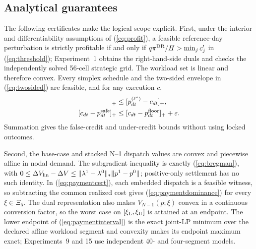 \documentclass[10pt,journal]{IEEEtran}
\begin{document}
\subsection{Analytical guarantees}

The following certificates make the logical scope explicit. First, under the
interior and differentiability assumptions of (\ref{eq:profit}), a feasible
reference-day perturbation is strictly profitable if and only if
$q\pi^{\rm DR}/H>\min_jc'_j$ in (\ref{eq:threshold}); Experiment~1 obtains the
right-hand-side duals and checks the independently solved 56-cell strategic
grid. The workload set is linear and therefore convex. Every simplex schedule
and the two-sided envelope in (\ref{eq:twosided}) are feasible, and for any
execution $c$,
\begin{align*}
[p^{\rm safe}_{dt}-c_{dt}]_+&\leq[p^{(\ell^\star)}_{dt}-c_{dt}]_+,\\
[c_{dt}-p^{\rm safe}_{dt}]_+&\leq[c_{dt}-p^{\rm floor}_{dt}]_++\varepsilon .
\end{align*}
Summation gives the false-credit and under-credit bounds without using locked
outcomes.

Second, the base-case and stacked N--1 dispatch values are convex and
piecewise affine in nodal demand. The subgradient inequality is exactly
(\ref{eq:bregman}), with
$0\leq\Delta V_{\rm lin}-\Delta V\leq
\lVert\lambda^1-\lambda^0\rVert_*\lVert p^1-p^0\rVert$; positive-only
settlement has no such identity. In (\ref{eq:paymentcert}), each embedded
dispatch is a feasible witness, so subtracting the common realized cost gives
(\ref{eq:paymentdominance}) for every $\xi\in\Xi_5$. The dual representation
also makes $V_{N-1}(p;\xi)$ convex in a continuous conversion factor, so the
worst case on $[\xi_{\rm L},\xi_{\rm U}]$ is attained at an endpoint. The
lower endpoint of (\ref{eq:paymentinterval}) is the exact joint-LP minimum over
the declared affine workload segment and convexity makes its endpoint maximum
exact; Experiments~9 and 15 use independent 40- and four-segment models.
\end{document}
